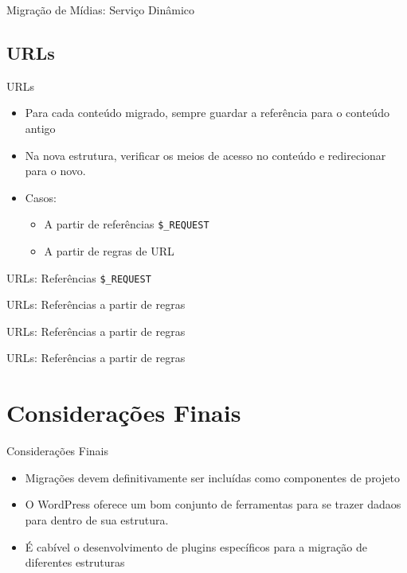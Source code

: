 \documentclass{beamer}
\begin{document}
\begin{frame}{Migração de Mídias: Serviço Dinâmico}
  
\end{frame}


\subsection{URLs}

\begin{frame}{URLs}
  \begin{itemize}
    \item Para cada conteúdo migrado, sempre guardar a referência
          para o conteúdo antigo
    \pause \item Na nova estrutura, verificar os meios de acesso no conteúdo
           e redirecionar para o novo.
    \pause \item Casos:
    \begin{itemize}
      \item A partir de referências \texttt{\$\_REQUEST}
      \item A partir de regras de URL
    \end{itemize}
  \end{itemize}
\end{frame}

\begin{frame}{URLs: Referências \texttt{\$\_REQUEST}}
  
\end{frame}

\begin{frame}{URLs: Referências a partir de regras}
  
\end{frame}

\begin{frame}{URLs: Referências a partir de regras}
  
\end{frame}

\begin{frame}{URLs: Referências a partir de regras}
  
\end{frame}


\section{Considerações Finais}

\begin{frame}{Considerações Finais}
  \begin{itemize}
    \item Migrações devem definitivamente ser incluídas como
          componentes de projeto
    \item O WordPress oferece um bom conjunto de ferramentas
          para se trazer dadaos para dentro de sua estrutura.
    \item É cabível o desenvolvimento de plugins específicos
          para a migração de diferentes estruturas
  \end{itemize}
\end{frame}
\end{document}
